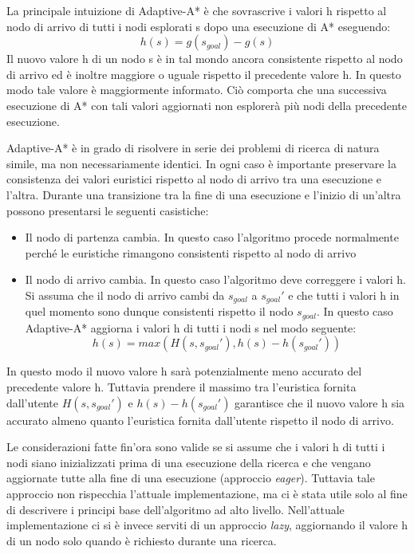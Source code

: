 \documentclass[12pt]{book}
\begin{document}
\par{La principale intuizione di Adaptive-A* \`e che sovrascrive i valori h rispetto al nodo di arrivo di tutti i nodi esplorati s dopo una esecuzione di A* eseguendo: \begin{equation}h(s) = g(s_{goal}) - g(s)\end{equation}
Il nuovo valore h di un nodo s \`e in tal mondo ancora consistente rispetto al nodo di arrivo ed \`e inoltre maggiore o uguale rispetto il precedente valore h. In questo modo tale valore \`e maggiormente informato. Ci\`o comporta che una successiva esecuzione di A* con tali valori aggiornati non esplorer\`a pi\`u nodi della precedente esecuzione.
}

\par{Adaptive-A* \`e in grado di risolvere in serie dei problemi di ricerca di natura simile, ma non necessariamente identici. In ogni caso \`e importante preservare la consistenza dei valori euristici rispetto al nodo di arrivo tra una esecuzione e l'altra. Durante una transizione tra la fine di una esecuzione e l'inizio di un'altra possono presentarsi le seguenti casistiche: 
\begin{itemize}
\item Il nodo di partenza cambia. In questo caso l'algoritmo procede normalmente perch\'e le euristiche rimangono consistenti rispetto al nodo di arrivo
\item Il nodo di arrivo cambia. In questo caso l'algoritmo deve correggere i valori h. Si assuma che il nodo di arrivo cambi da $s_{goal}$ a $s_{goal}'$ e che tutti i valori h in quel momento sono dunque consistenti rispetto il nodo $s_{goal}$. In questo caso Adaptive-A* aggiorna i valori h di tutti i nodi s nel modo seguente: \begin{equation}h(s) = max(H(s,s_{goal}'), h(s) - h(s_{goal}')) \end{equation}
\end{itemize} 
In questo modo il nuovo valore h sar\`a potenzialmente meno accurato del precedente valore h. Tuttavia prendere il massimo tra l'euristica fornita dall'utente $H(s,s_{goal}')$ e $h(s) - h(s_{goal}')$ garantisce che il nuovo valore h sia accurato almeno quanto l'euristica fornita dall'utente rispetto il nodo di arrivo.
}
\par{Le considerazioni fatte fin'ora sono valide se si assume che i valori h di tutti i nodi siano inizializzati prima di una esecuzione della ricerca e che vengano aggiornate tutte alla fine di una esecuzione (approccio \emph{eager}). Tuttavia tale approccio non rispecchia l'attuale implementazione, ma ci \`e stata utile solo al fine di descrivere i principi base dell'algoritmo ad alto livello. Nell'attuale implementazione ci si \`e invece serviti di un approccio \emph{lazy}, aggiornando il valore h di un nodo solo quando \`e richiesto durante una ricerca.}
\end{document}
